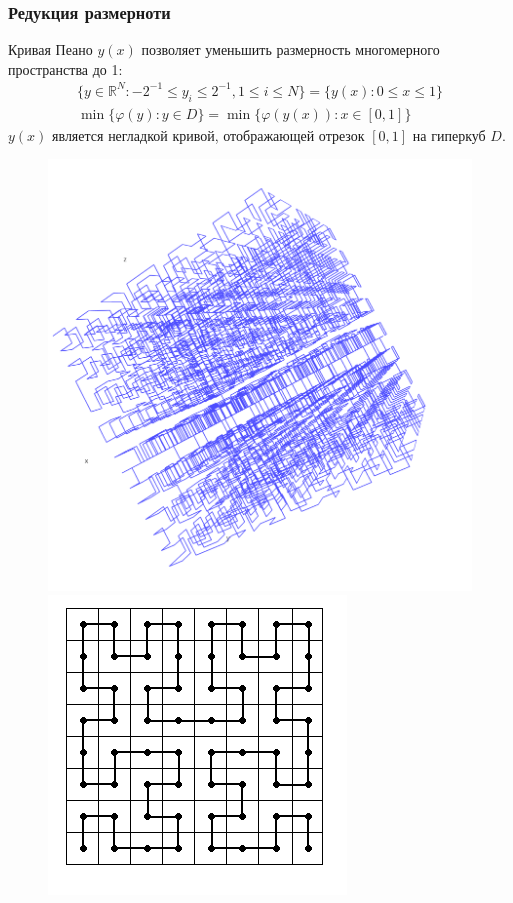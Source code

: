 \documentclass[aspectratio=1610]{beamer}
\begin{document}
\begin{frame}
  \frametitle{Редукция размерноти}
  \begin{center}
  Кривая Пеано \(y(x)\) позволяет уменьшить размерность многомерного пространства до 1:
  \begin{gather}
    \lbrace y\in \mathbb{R}^N:-2^{-1}\leqslant y_i\leqslant 2^{-1},1\leqslant i\leqslant N\rbrace=\{y(x):0\leqslant x\leqslant 1\} \nonumber \\
    \min\{\varphi(y): y\in D\}=\min\{\varphi(y(x)): x\in [0,1]\} \nonumber
  \end{gather}
  \(y(x)\) является негладкой кривой, отображающей отрезок \([0,1]\) на гиперкуб \(D\).
  \begin{figure}[ht]
    \includegraphics[width=.35\textwidth]{peano3d.png}
    \includegraphics[width=.35\textwidth]{peano2d.png}
  \end{figure}
\end{center}
\end{frame}
\end{document}
